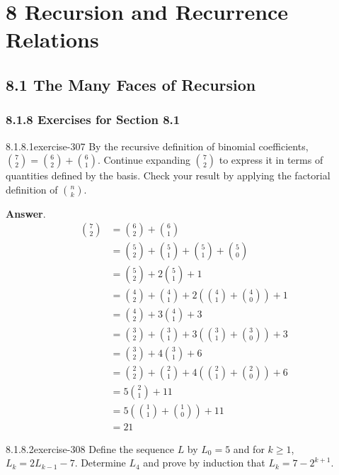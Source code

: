 \documentclass[twoside,10pt,]{book}
\numberwithin{equation}{section}
\begin{document}
\chapter*{8 Recursion and Recurrence Relations}
\section*{8.1 The Many Faces of Recursion}
\subsection*{8.1.8 Exercises for Section 8.1}
\begin{divisionsolution}{8.1.8.1}{}{exercise-307}%
\hypertarget{p-2565}{}%
By the recursive definition of binomial coefficients, \(\binom{7}{2}=\binom{6}{2} +\binom{6}{1}\). Continue expanding \(\binom{7}{2}\) to express it in terms of quantities defined by the basis. Check your result by applying the factorial definition of \(\binom{n}{k}\).%
\par\smallskip%
\noindent\textbf{Answer}.\quad%
\hypertarget{p-2566}{}%
%
\begin{equation*}
\begin{split}
\binom{7}{2} &=\binom{6}{2} +\binom{6}{1} \\
&=\binom{5}{2} +\binom{5}{1} +\binom{5}{1} +\binom{5}{0} \\
&=\binom{5}{2} +2 \binom{5}{1} +1\\
&=\binom{4}{2} +\binom{4}{1} +2(\binom{4}{1} +\binom{4}{0} )+1\\
&=\binom{4}{2} +3 \binom{4}{1} + 3\\
&=\binom{3}{2} +\binom{3}{1} +3(\binom{3}{1} +\binom{3}{0} )+3\\
&=\binom{3}{2} +4 \binom{3}{1}  + 6\\
&=\binom{2}{2} +\binom{2}{1} + 4(\binom{2}{1} +\binom{2}{0} ) + 6\\
&=5 \binom{2}{1} + 11\\
&=5(\binom{1}{1} +\binom{1}{0} ) + 11\\
&=21
\end{split}
\end{equation*}
%
\end{divisionsolution}%
\begin{divisionsolution}{8.1.8.2}{}{exercise-308}%
\hypertarget{p-2567}{}%
Define the sequence \(L\) by \(L_0 = 5\) and for \(k\geq 1\), \(L _k = 2L_{k-1}-7\).  Determine \(L_4\) and prove by induction that \(L_k=7-2^{k+1}\).%
\end{divisionsolution}%
\end{document}
